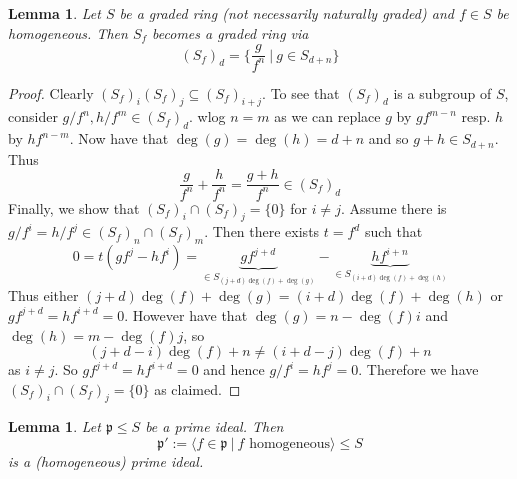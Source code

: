 \documentclass{scrartcl}
\newcommand{\p}{\mathfrak{p}}
\newtheorem{lemma}[prop]{Lemma}
\theoremstyle{definition}
\begin{document}
\begin{lemma}
    Let $S$ be a graded ring (not necessarily naturally graded) and $f \in S$ be homogeneous. Then $S_f$ becomes a graded ring via
    \begin{equation*}
        \left(S_f\right)_d = \{ \frac g {f^n} \ | \ g \in S_{d + n} \}
    \end{equation*}
\end{lemma}
\begin{proof}
    Clearly $(S_f)_i (S_f)_j \subseteq (S_f)_{i + j}$.
    To see that $(S_f)_d$ is a subgroup of $S$, consider $g/f^n, h/f^m \in (S_f)_d$.
    wlog $n = m$ as we can replace $g$ by $gf^{m - n}$ resp. $h$ by $hf^{n - m}$.
    Now have that $\deg(g) = \deg(h) = d + n$ and so $g + h \in S_{d + n}$.
    Thus
    \begin{equation*}
        \frac g {f^n} + \frac h {f^n} = \frac {g + h} {f^n} \in (S_f)_d
    \end{equation*}
    Finally, we show that $(S_f)_i \cap (S_f)_j = \{ 0 \}$ for $i \neq j$.
    Assume there is $g/f^i = h/f^j \in (S_f)_n \cap (S_f)_m$.
    Then there exists $t = f^d$ such that
    \begin{equation*}
        0 = t(gf^j - hf^i) = \underbrace{g f^{j + d}}_{\in S_{(j + d)\deg(f) + \deg(g)}} - \underbrace{h f^{i + n}}_{\in S_{(i + d)\deg(f) + \deg(h)}}
    \end{equation*}
    Thus either $(j + d)\deg(f) + \deg(g) = (i + d)\deg(f) + \deg(h)$ or $gf^{j + d} = hf^{i + d} = 0$.
    However have that $\deg(g) = n - \deg(f)i$ and $\deg(h) = m - \deg(f)j$, so
    \begin{equation*}
        (j + d - i)\deg(f) + n \neq (i + d - j)\deg(f) + n
    \end{equation*}
    as $i \neq j$.
    So $gf^{j + d} = hf^{i + d} = 0$ and hence $g/f^i = hf^j = 0$.
    Therefore we have $(S_f)_i \cap (S_f)_j = \{ 0 \}$ as claimed.
\end{proof}
\begin{lemma}
    \label{prop:homogeneous_part_prime}
    Let $\p \leq S$ be a prime ideal.
    Then
    \begin{equation*}
        \p' := \langle f \in \p \ | \ \text{$f$ homogeneous} \rangle \leq S
    \end{equation*}
    is a (homogeneous) prime ideal.
\end{lemma}
\end{document}
